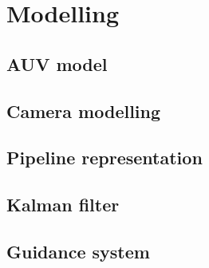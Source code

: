 \chapter{Modelling}


\section{AUV model}



\section{Camera modelling}


\section{Pipeline representation}


\section{Kalman filter}



\section{Guidance system}